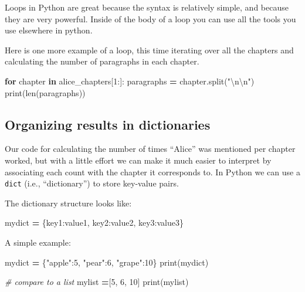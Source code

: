 \documentclass[]{book}
\newenvironment{Shaded}{\begin{snugshade}}{\end{snugshade}}
\newcommand{\BuiltInTok}[1]{#1}
\newcommand{\CharTok}[1]{\textcolor[rgb]{0.31,0.60,0.02}{#1}}
\newcommand{\CommentTok}[1]{\textcolor[rgb]{0.56,0.35,0.01}{\textit{#1}}}
\newcommand{\ControlFlowTok}[1]{\textcolor[rgb]{0.13,0.29,0.53}{\textbf{#1}}}
\newcommand{\DecValTok}[1]{\textcolor[rgb]{0.00,0.00,0.81}{#1}}
\newcommand{\KeywordTok}[1]{\textcolor[rgb]{0.13,0.29,0.53}{\textbf{#1}}}
\newcommand{\NormalTok}[1]{#1}
\newcommand{\OperatorTok}[1]{\textcolor[rgb]{0.81,0.36,0.00}{\textbf{#1}}}
\newcommand{\StringTok}[1]{\textcolor[rgb]{0.31,0.60,0.02}{#1}}
\begin{document}
Loops in Python are great because the syntax is relatively simple, and because they are very powerful. Inside of the body of a loop you can use all the tools you use elsewhere in python.

Here is one more example of a loop, this time iterating over all the chapters and calculating the number of paragraphs in each chapter.

\begin{Shaded}
\begin{Highlighting}[]
\ControlFlowTok{for}\NormalTok{ chapter }\KeywordTok{in}\NormalTok{ alice_chapters[}\DecValTok{1}\NormalTok{:]:}
\NormalTok{    paragraphs }\OperatorTok{=}\NormalTok{ chapter.split(}\StringTok{"}\CharTok{\textbackslash{}n\textbackslash{}n}\StringTok{"}\NormalTok{)}
    \BuiltInTok{print}\NormalTok{(}\BuiltInTok{len}\NormalTok{(paragraphs))}
\end{Highlighting}
\end{Shaded}

\hypertarget{organizing-results-in-dictionaries}{%
\subsection{Organizing results in dictionaries}\label{organizing-results-in-dictionaries}}

Our code for calculating the number of times ``Alice'' was mentioned per chapter worked, but with a little effort we can make it much easier to interpret by associating each count with the chapter it corresponds to. In Python we can use a \texttt{dict} (i.e., ``dictionary'') to store key-value pairs.

The dictionary structure looks like:

\begin{Shaded}
\begin{Highlighting}[]
\NormalTok{mydict }\OperatorTok{=}\NormalTok{ \{key1:value1, key2:value2, key3:value3\}}
\end{Highlighting}
\end{Shaded}

A simple example:

\begin{Shaded}
\begin{Highlighting}[]
\NormalTok{mydict }\OperatorTok{=}\NormalTok{ \{}\StringTok{"apple"}\NormalTok{:}\DecValTok{5}\NormalTok{, }\StringTok{"pear"}\NormalTok{:}\DecValTok{6}\NormalTok{, }\StringTok{"grape"}\NormalTok{:}\DecValTok{10}\NormalTok{\}}
\BuiltInTok{print}\NormalTok{(mydict)}

\CommentTok{# compare to a list}
\NormalTok{mylist }\OperatorTok{=}\NormalTok{[}\DecValTok{5}\NormalTok{, }\DecValTok{6}\NormalTok{, }\DecValTok{10}\NormalTok{]}
\BuiltInTok{print}\NormalTok{(mylist)}
\end{Highlighting}
\end{Shaded}
\end{document}
